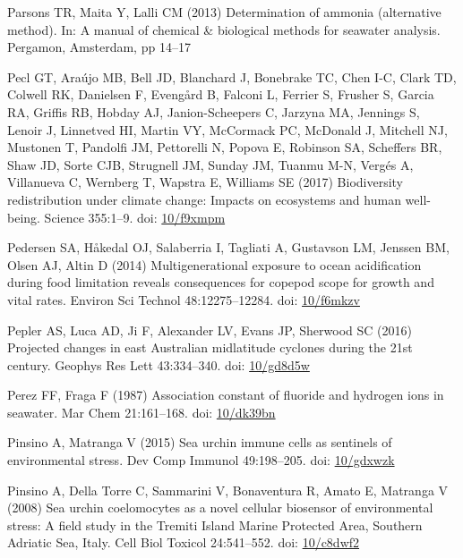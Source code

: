 \documentclass[a4paper,10pt, oneside]{memoir}
\begin{document}
\leavevmode\hypertarget{ref-Parsons2013}{}%
Parsons TR, Maita Y, Lalli CM (2013) Determination of ammonia (alternative method). In: A manual of chemical \& biological methods for seawater analysis. Pergamon, Amsterdam, pp 14--17

\leavevmode\hypertarget{ref-Pecl2017}{}%
Pecl GT, Araújo MB, Bell JD, Blanchard J, Bonebrake TC, Chen I-C, Clark TD, Colwell RK, Danielsen F, Evengård B, Falconi L, Ferrier S, Frusher S, Garcia RA, Griffis RB, Hobday AJ, Janion-Scheepers C, Jarzyna MA, Jennings S, Lenoir J, Linnetved HI, Martin VY, McCormack PC, McDonald J, Mitchell NJ, Mustonen T, Pandolfi JM, Pettorelli N, Popova E, Robinson SA, Scheffers BR, Shaw JD, Sorte CJB, Strugnell JM, Sunday JM, Tuanmu M-N, Vergés A, Villanueva C, Wernberg T, Wapstra E, Williams SE (2017) Biodiversity redistribution under climate change: Impacts on ecosystems and human well-being. Science 355:1--9. doi: \href{https://doi.org/10/f9xmpm}{10/f9xmpm}

\leavevmode\hypertarget{ref-Pedersen2014}{}%
Pedersen SA, Håkedal OJ, Salaberria I, Tagliati A, Gustavson LM, Jenssen BM, Olsen AJ, Altin D (2014) Multigenerational exposure to ocean acidification during food limitation reveals consequences for copepod scope for growth and vital rates. Environ Sci Technol 48:12275--12284. doi: \href{https://doi.org/10/f6mkzv}{10/f6mkzv}

\leavevmode\hypertarget{ref-Pepler2016}{}%
Pepler AS, Luca AD, Ji F, Alexander LV, Evans JP, Sherwood SC (2016) Projected changes in east Australian midlatitude cyclones during the 21st century. Geophys Res Lett 43:334--340. doi: \href{https://doi.org/10/gd8d5w}{10/gd8d5w}

\leavevmode\hypertarget{ref-Perez1987}{}%
Perez FF, Fraga F (1987) Association constant of fluoride and hydrogen ions in seawater. Mar Chem 21:161--168. doi: \href{https://doi.org/10/dk39bn}{10/dk39bn}

\leavevmode\hypertarget{ref-Pinsino2015}{}%
Pinsino A, Matranga V (2015) Sea urchin immune cells as sentinels of environmental stress. Dev Comp Immunol 49:198--205. doi: \href{https://doi.org/10/gdxwzk}{10/gdxwzk}

\leavevmode\hypertarget{ref-Pinsino2008}{}%
Pinsino A, Della Torre C, Sammarini V, Bonaventura R, Amato E, Matranga V (2008) Sea urchin coelomocytes as a novel cellular biosensor of environmental stress: A field study in the Tremiti Island Marine Protected Area, Southern Adriatic Sea, Italy. Cell Biol Toxicol 24:541--552. doi: \href{https://doi.org/10/c8dwf2}{10/c8dwf2}
\end{document}
